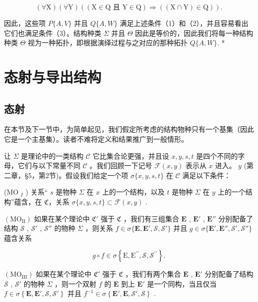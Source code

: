 \[
(\forall \mathrm{X}) (\forall \mathrm{Y}) ((\mathrm{X} \in \mathrm{Q} \text {   且   } \mathrm{Y} \in \mathrm{Q}) \Longrightarrow ((\mathrm{X} \cap \mathrm{Y}) \in \mathrm{Q})).
\]

因此，这些项 \(P\{A,V\}\) 并且 \(Q\{A,W\}\) 满足上述条件（1）和（2），并且容易看出它们也满足条件（3）。结构种类 \(\Sigma\) 并且 \(\Theta\) 因此是等价的，因此我们将每一种结构种类 \(\Theta\) 视为一种拓扑，即根据演绎过程与之对应的那种拓扑 \(Q\{A,W\}\). *

\section{态射与导出结构}

\subsection{态射}

在本节及下一节中，为简单起见，我们假定所考虑的结构物种只有一个基集（因此它是一个主基集）。读者不难将定义和结果推广到一般情形。

让 \(\Sigma\) 是理论中的一类结构 \(\mathcal{C}\) 它比集合论更强，并且设 \(x, y, s, t\) 是四个不同的字母，它们与以下常量不同 \(\mathcal{C}\) 。我们回顾一下记号 \(\mathcal{F}(x, y)\) 表示从 \(x\) 进入。 \(y\) (第二章，§5，第2节)。假设我们给定一个项 \(\sigma\{x, y, s, t\}\) 在 \(\mathcal{C}\) 满足以下条件：

(MO \(_{I}\) ) 关系“ \(s\) 是物种 \(\Sigma\) 在 \(x\) 上的一个结构，以及 \(t\) 是物种 \(\Sigma\) 在 \(y\) 上的一个结构”蕴含，在 \(\mathfrak{C}\)，关系 \(\sigma\{x,y,s,t\} \subset \mathcal{F}(x,y)\) .

\((\mathrm{MO}_{\mathrm{II}})\) 如果在某个理论中 \(\mathfrak{C}'\) 强于 \(\mathfrak{C}\) ，我们有三组集合 \(\mathbf{E}\) , \(\mathbf{E}'\) , \(\mathbf{E}''\) 分别配备了结构 \(\mathscr{S}\) , \(\mathscr{S}'\) , \(\mathscr{S}''\) 的物种 \(\Sigma\) ，则关系 \(f \in \sigma \{ \mathbf{E}, \mathbf{E}', \mathscr{S}, \mathscr{S}' \}\) 并且 \(g \in \sigma \{ \mathbf{E}', \mathbf{E}'', \mathscr{S}', \mathscr{S}'' \}\) 蕴含关系

\[
g \circ f \in \sigma \left\{\mathrm{E}, \mathrm{E} ^ {\prime \prime}, \mathscr {S}, \mathscr {S} ^ {\prime \prime} \right\}.
\]

\((\mathrm{MO}_{\mathrm{III}})\) 如果在某个理论中 \(\mathfrak{C}'\) 强于 \(\mathfrak{C}\) ，我们有两个集合 \(\mathbf{E}\) , \(\mathbf{E}'\) 分别配备了结构 \(\mathcal{S}\) , \(\mathcal{S}'\) 的物种 \(\Sigma\) ，则一个双射 \(f\) 的 \(\mathbf{E}\) 到上 \(\mathbf{E}'\) 是一个同构，当且仅当 \(f \in \sigma \left\{\mathbf{E}, \mathbf{E}', \mathcal{S}, \mathcal{S}'\right\}\) 并且 \(f^{-1} \in \sigma \left\{\mathbf{E}', \mathbf{E}, \mathcal{S}', \mathcal{S}\right\}\) .


